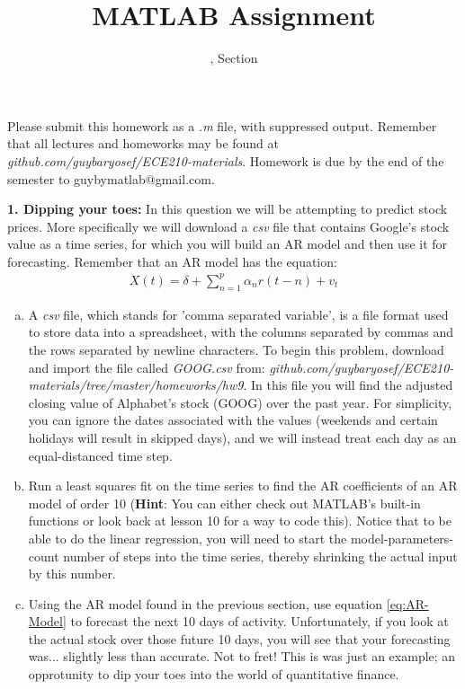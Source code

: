 \documentclass[11pt]{article}
\title{MATLAB Assignment \Homework}
\author{\Session, Section \Section}
\date{}
\makeatletter
\def\MyEmail{guybymatlab@gmail.com}
\makeatother
\begin{document}
\maketitle
Please submit this homework as a \textit{.m} file, 
with suppressed output.
Remember that all lectures and homeworks may be found at 
\textit{github.com/guybaryosef/ECE210-materials}.
Homework is due by the end of the semester to \MyEmail.

\noindent
\newline
\textbf{1. Dipping your toes:}
In this question we will be attempting to predict stock prices.
More specifically we will download a \textit{csv} file that
contains Google's stock value as a time series, for which you will build an AR model and then
use it for forecasting. Remember that an AR model has the equation:
\begin{eqnarray}\label{eq:AR-Model}
    X(t) = \delta + \sum_{n = 1}^{p}\alpha_nr(t-n) + v_t
\end{eqnarray}

\begin{enumerate}[a.]
    \item A \textit{csv} file, which stands for 'comma separated variable',
    is a file format used to store data into a spreadsheet, 
    with the columns separated by commas and the rows separated by 
    newline characters.
    To begin this problem, download and import the file called \textit{GOOG.csv}
    from:
    \textit{github.com/guybaryosef/ECE210-materials/tree/master/homeworks/hw9}.
    In this file you will find the adjusted closing value of Alphabet's stock
    (GOOG) over the past year.
    For simplicity, you can ignore the dates associated with the values
    (weekends and certain holidays will result in skipped days),
    and we will instead treat each day as an equal-distanced time step.

    \item Run a least squares fit on the time series to find the AR
    coefficients of an AR model of order 10 (\textbf{Hint}: You can either check
    out MATLAB's built-in functions or look back at lesson 10 for a way to code
    this).
    Notice that to be able to do the linear regression, you will need to
    start the model-parameters-count number of steps into the time series,
    thereby shrinking the actual input by this number. 

    \item Using the AR model found in the previous section, use equation
    \eqref{eq:AR-Model} to forecast the next 10 days of activity.
    Unfortunately, if you look at the actual stock over those future 10 days,
    you will see that your forecasting was... slightly less than accurate. 
    Not to fret!
    This is was just an example; an opprotunity to dip your toes into the world
    of quantitative finance.
\end{enumerate}
\end{document}
